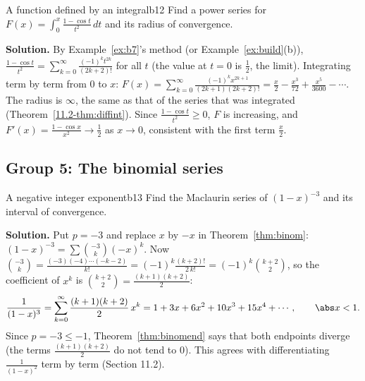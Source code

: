 \documentclass[11pt]{article}
\begin{document}
\begin{exmp}{A function defined by an integral}{b12}
Find a power series for $F(x)=\displaystyle\int_0^x\frac{1-\cos t}{t^2}\,dt$ and its radius of convergence.

\textbf{Solution.} By Example~\ref{ex:b7}'s method (or Example~\ref{ex:build}(b)), $\frac{1-\cos t}{t^2}=\sum_{k=0}^\infty\frac{(-1)^kt^{2k}}{(2k+2)!}$ for all $t$ (the value at $t=0$ is $\frac12$, the limit). Integrating term by term from $0$ to $x$: $F(x)=\sum_{k=0}^\infty\frac{(-1)^kx^{2k+1}}{(2k+1)(2k+2)!}=\frac x2-\frac{x^3}{72}+\frac{x^5}{3600}-\cdots$. The radius is $\infty$, the same as that of the series that was integrated (Theorem~\ref{11.2-thm:diffint}). Since $\frac{1-\cos t}{t^2}\ge0$, $F$ is increasing, and $F'(x)=\frac{1-\cos x}{x^2}\to\frac12$ as $x\to0$, consistent with the first term $\frac x2$.
\end{exmp}

\subsection*{Group 5: The binomial series}

\begin{exmp}{A negative integer exponent}{b13}
Find the Maclaurin series of $(1-x)^{-3}$ and its interval of convergence.

\textbf{Solution.} Put $p=-3$ and replace $x$ by $-x$ in Theorem~\ref{thm:binom}: $(1-x)^{-3}=\sum\binom{-3}k(-x)^k$. Now $\binom{-3}k=\frac{(-3)(-4)\cdots(-k-2)}{k!}=(-1)^k\frac{(k+2)!}{2\,k!}=(-1)^k\binom{k+2}2$, so the coefficient of $x^k$ is $\binom{k+2}2=\frac{(k+1)(k+2)}2$:
\[
\frac1{(1-x)^3}=\sum_{k=0}^\infty\frac{(k+1)(k+2)}2\,x^k=1+3x+6x^2+10x^3+15x^4+\cdots,\qquad\abs x<1 .
\]
Since $p=-3\le-1$, Theorem~\ref{thm:binomend} says that both endpoints diverge (the terms $\frac{(k+1)(k+2)}2$ do not tend to $0$). This agrees with differentiating $\frac1{(1-x)^2}$ term by term (Section 11.2).
\end{exmp}
\end{document}
